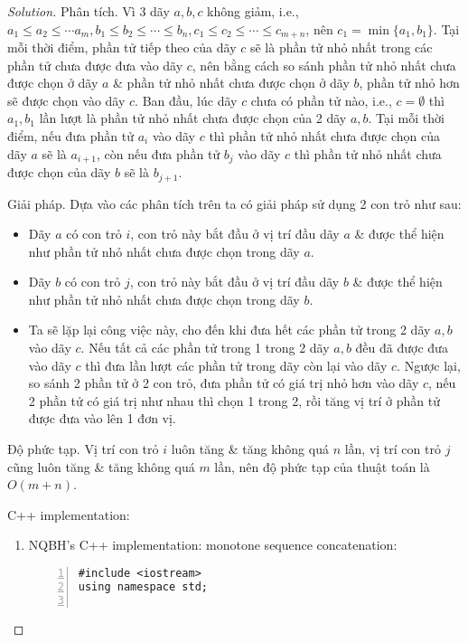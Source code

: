\documentclass{article}
\begin{document}
\begin{proof}[Solution]
    \item {\sf Phân tích.} Vì 3 dãy $a,b,c$ không giảm, i.e., $a_1\le a_2\le\cdots a_m,b_1\le b_2\le\cdots\le b_n,c_1\le c_2\le\cdots\le c_{m+n}$, nên $c_1 = \min\{a_1,b_1\}$. Tại mỗi thời điểm, phần tử tiếp theo của dãy $c$ sẽ là phần tử nhỏ nhất trong các phần tử chưa được đưa vào dãy $c$, nên bằng cách so sánh phần tử nhỏ nhất chưa được chọn ở dãy $a$ \& phần tử nhỏ nhất chưa được chọn ở dãy $b$, phần tử nhỏ hơn sẽ được chọn vào dãy $c$. Ban đầu, lúc dãy $c$ chưa có phần tử nào, i.e., $c = \emptyset$ thì $a_1,b_1$ lần lượt là phần tử nhỏ nhất chưa được chọn của 2 dãy $a,b$. Tại mỗi thời điểm, nếu đưa phần tử $a_i$ vào dãy $c$ thì phần tử nhỏ nhất chưa được chọn của dãy $a$ sẽ là $a_{i+1}$, còn nếu đưa phần tử $b_j$ vào dãy $c$ thì phần tử nhỏ nhất chưa được chọn của dãy $b$ sẽ là $b_{j+1}$.
    \item {\sf Giải pháp.} Dựa vào các phân tích trên ta có giải pháp sử dụng 2 con trỏ như sau:
    \begin{itemize}
        \item Dãy $a$ có con trỏ $i$, con trỏ này bắt đầu ở vị trí đầu dãy $a$ \& được thể hiện như phần tử nhỏ nhất chưa được chọn trong dãy $a$.
        \item Dãy $b$ có con trỏ $j$, con trỏ này bắt đầu ở vị trí đầu dãy $b$ \& được thể hiện như phần tử nhỏ nhất chưa được chọn trong dãy $b$.
        \item Ta sẽ lặp lại công việc này, cho đến khi đưa hết các phần tử trong 2 dãy $a,b$ vào dãy $c$. Nếu tất cả các phần tử trong 1 trong 2 dãy $a,b$ đều đã được đưa vào dãy $c$ thì đưa lần lượt các phần tử trong dãy còn lại vào dãy $c$. Ngược lại, so sánh 2 phần tử ở 2 con trỏ, đưa phần tử có giá trị nhỏ hơn vào dãy $c$, nếu 2 phần tử có giá trị như nhau thì chọn 1 trong 2, rồi tăng vị trí ở phần tử được đưa vào lên 1 đơn vị.
    \end{itemize}
    \item {\sf Độ phức tạp.} Vị trí con trỏ $i$ luôn tăng \& tăng không quá $n$ lần, vị trí con trỏ $j$ cũng luôn tăng \& tăng không quá $m$ lần, nên độ phức tạp của thuật toán là $O(m + n)$.

    C++ implementation:
    \begin{enumerate}
        \item NQBH's C++ implementation: monotone sequence concatenation:
        \begin{Verbatim}[numbers=left,xleftmargin=5mm]
#include <iostream>
using namespace std;


\end{Verbatim}
\end{enumerate}
\end{proof}
\end{document}
